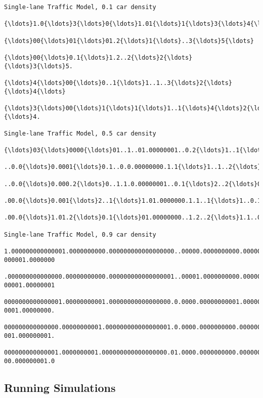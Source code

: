 \documentclass[11pt]{article}
\begin{document}
    \begin{Verbatim}[commandchars=\\\{\},fontsize=\footnotesize]
Single-lane Traffic Model, 0.1 car density

{\ldots}1.0{\ldots}3{\ldots}0{\ldots}1.01{\ldots}1{\ldots}3{\ldots}4{\ldots}

{\ldots}00{\ldots}01{\ldots}01.2{\ldots}1{\ldots}..3{\ldots}5{\ldots}

{\ldots}00{\ldots}0.1{\ldots}1.2..2{\ldots}2{\ldots}{\ldots}3{\ldots}5.

{\ldots}4{\ldots}00{\ldots}0..1{\ldots}1..1..3{\ldots}2{\ldots}{\ldots}4{\ldots}

{\ldots}3{\ldots}00{\ldots}1{\ldots}1{\ldots}1..1{\ldots}4{\ldots}2{\ldots}{\ldots}4.

Single-lane Traffic Model, 0.5 car density

{\ldots}03{\ldots}0000{\ldots}01..1..01.00000001..0.2{\ldots}1..1{\ldots}0005{\ldots}0.0.2..01.2..1.0.001.0.01.001.02..0003

..0.0{\ldots}0.0001{\ldots}0.1..0.0.00000000.1.1{\ldots}1..1..2{\ldots}000{\ldots}00.0{\ldots}01.1..1.00.01.01.1.001.01..0001.

..0.0{\ldots}0.000.2{\ldots}0..1.1.0.00000001..0.1{\ldots}2..2{\ldots}0.000{\ldots}01.1{\ldots}1.1.2..001.0.01.1.000.01.1.000.2

.00.0{\ldots}0.001{\ldots}2..1{\ldots}1.01.0000000.1.1..1{\ldots}1..0.1.000{\ldots}1.1.2{\ldots}1.2..001.01.0.1.0000.0.1.0001..

.00.0{\ldots}1.01.2{\ldots}0.1{\ldots}01.00000000..1.2..2{\ldots}1.1..0001{\ldots}0.2..1..2..001.00.01..00000.1..0000.2.

Single-lane Traffic Model, 0.9 car density

1.000000000000001.0000000000.000000000000000000..00000.0000000000.00000000001.0000.000
000001.0000000

.000000000000000.00000000000.000000000000000001..00001.0000000000.0000000001.00000.000
00001.00000001

0000000000000001.00000000001.00000000000000000.0.0000.00000000001.000000000.000001.000
0001.00000000.

000000000000000.00000000001.000000000000000001.0.0000.0000000000.0000000000.00000.0000
001.000000001.

000000000000001.0000000001.000000000000000000.01.0000.0000000000.0000000000.00001.0000
00.000000001.0
    \end{Verbatim}

    \subsection{Running Simulations}
\end{document}
